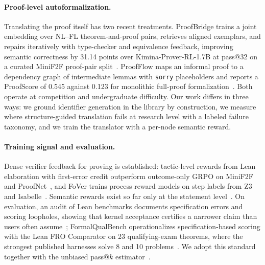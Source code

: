 \documentclass[sigconf,anonymous]{aamas}
\begin{document}
{\paragraph{Proof-level autoformalization.} Translating the proof itself has two
recent treatments. ProofBridge trains a joint embedding over NL--FL
theorem-and-proof pairs, retrieves aligned exemplars, and repairs iteratively
with type-checker and equivalence feedback, improving semantic correctness by
31.14 points over Kimina-Prover-RL-1.7B at pass@32 on a curated MiniF2F
proof-pair split~\citep{proofbridge2025}. ProofFlow maps an informal proof to a
dependency graph of intermediate lemmas with \texttt{sorry} placeholders and
reports a ProofScore of 0.545 against 0.123 for monolithic full-proof
formalization~\citep{proofflow2025}. Both operate at competition and
undergraduate difficulty. Our work differs in three ways: we ground identifier
generation in the library by construction, we measure where structure-guided
translation fails at research level with a labeled failure taxonomy, and we
train the translator with a per-node semantic reward.

\paragraph{Training signal and evaluation.} Dense verifier feedback for proving
is established: tactic-level rewards from Lean elaboration with first-error
credit outperform outcome-only GRPO on MiniF2F and
ProofNet~\citep{processrl2026}, and FoVer trains process reward models on step
labels from Z3 and Isabelle~\citep{fover2025}. Semantic rewards exist so far
only at the statement level~\citep{formarl2025, mathesis2025, criticlean2025}.
On evaluation, an audit of Lean benchmarks documents specification errors and
scoring loopholes, showing that kernel acceptance certifies a narrower claim
than users often assume~\citep{faultsbench2026}; FormalQualBench operationalizes
specification-based scoring with the Lean FRO Comparator on 23 qualifying-exam
theorems, where the strongest published harnesses solve 8 and 10
problems~\citep{formalqualbench2026, opengauss2026, merlean2026}. We adopt this
standard together with the unbiased pass@$k$ estimator~\citep{chen2021codex}.
}
\end{document}
